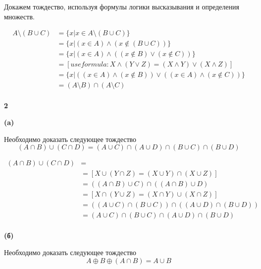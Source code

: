 \documentclass{article}
\begin{document}
Докажем тождество, используя формулы логики высказывания и определения множеств. 

\begin{equation} 
\begin{split}
A \setminus (B \cup C) & = \{x | x \in A \setminus (B \cup C) \} \\
 & = \{x | (x \in A) \wedge (x \notin (B \cup C)) \} \\
 & = \{x | (x \in A) \wedge ( (x \notin B) \vee (x \notin C)) \} \\
 & = [ use formula: X \wedge (Y \vee Z) = (X \wedge Y) \vee (X \wedge Z)]  \\ 
 & = \{x | ((x \in A) \wedge (x \notin B)) \vee ((x \in A) \wedge (x \notin C)) \} \\
 & = (A \setminus B) \cap (A \setminus C) \\
\end{split}
\end{equation}


\newpage

\textbf{2} 

\textbf{(a)}

Необходимо доказать следующее тождество
$$ (A \cap B) \cup (C \cap D) = (A \cup C) \cap (A \cup D) \cap (B \cup C) \cap (B \cup D)$$

\begin{equation} 
\begin{split}
(A \cap B) \cup (C \cap D) & =  \\
 & = [X \cup (Y \cap Z) = (X \cup Y) \cap (X \cup Z)] \\
 & = ((A \cap B) \cup C) \cap ((A \cap B) \cup D) \\
 & = [X \cap (Y \cup Z) = (X \cap Y) \cup (X \cap Z)] \\
 & = ((A \cup C) \cap (B \cup C)) \cap ((A \cup D) \cap (B \cup D)) \\
 & = (A \cup C) \cap (B \cup C) \cap (A \cup D) \cap (B \cup D) \\
\end{split}
\end{equation}

\textbf{(б)}

Необходимо доказать следующее тождество
$$ A \oplus B \oplus (A \cap B) = A \cup B$$
\end{document}
